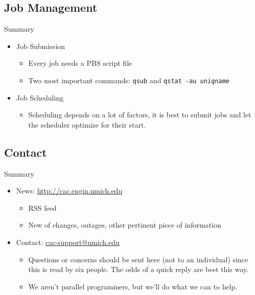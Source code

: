\documentclass{beamer}
\begin{document}
\subsection{Job Management}
\begin{frame}{Summary}
 \begin{itemize}
   \item Job Submission
     \begin{itemize}
     \item Every job needs a PBS script file
     \item Two most important commands: \texttt{qsub} and \texttt{qstat -au \textit{uniqname}}
     \end{itemize}
   \item Job Scheduling
     \begin{itemize}
     \item Scheduling depends on a lot of factors, it is best to submit jobs and let the
scheduler optimize for their start.
     \end{itemize}
 \end{itemize}
\end{frame}
\subsection{Contact}
\begin{frame}{Summary}
 \begin{itemize}
 \item News: \url{http://cac.engin.umich.edu}
   \begin{itemize}
    \item RSS feed
    \item New of changes, outages, other pertinent piece of information
   \end{itemize}
  \item Contact: \url{cac-support@umich.edu}
   \begin{itemize}
    \item Questions or concerns should be sent here (not to an individual) since
this is read by six people.  The odds of a quick reply are best this way.
    \item We aren't parallel programmers, but we'll do what we can to help.
   \end{itemize}
 \end{itemize}
\end{frame}
\end{document}
